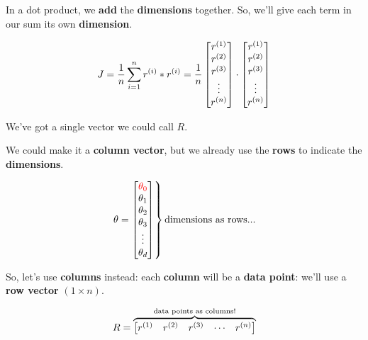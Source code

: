         In a dot product, we \textbf{add} the \textbf{dimensions} together. So, we'll give each term in our sum its own \textbf{dimension}.
        
        \begin{equation}
            J = \frac{1}{n}  \sum_{i=1}^n
            r^{(i)}*r^{(i)}
            =
            \frac{1}{n}
            \begin{bmatrix}
              r^{(1)} \\ r^{(2)} \\ r^{(3)} \\ \vdots \\ r^{(n)}
            \end{bmatrix}
            \cdot
            \begin{bmatrix}
              r^{(1)} \\ r^{(2)} \\ r^{(3)} \\ \vdots \\ r^{(n)}
            \end{bmatrix}
        \end{equation}
        
        We've got a single vector we could call $R$.
        
        We could make it a \textbf{column vector}, but we already use the \textbf{rows} to indicate the \textbf{dimensions}. 
        
        \begin{equation}
            \begin{drcases}
                \theta =
                \begin{bmatrix}
                  \red{\theta_0} \\ \theta_1 \\ \theta_2 \\ \theta_3 \\ \vdots \\ \theta_d
                \end{bmatrix}
            \end{drcases}
            \text{dimensions as rows...}
        \end{equation}
        
        So, let's use \textbf{columns} instead: each \textbf{column} will be a \textbf{data point}: we'll use a \textbf{row vector} $(1 \times n)$. 
        
        \begin{equation}
            R =
            \overbrace{
            \begin{bmatrix}
              r^{(1)} & r^{(2)} & r^{(3)} & \cdots & r^{(n)} 
            \end{bmatrix}
            }^{\text{data points as columns!}}
        \end{equation}
        
